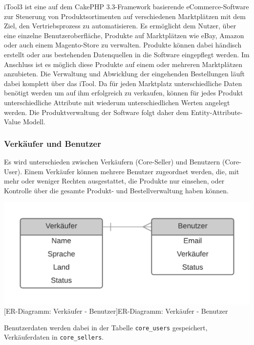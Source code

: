 	iTool3 ist eine auf dem CakePHP 3.3-Framework basierende eCommerce-Software  zur Steuerung von Produktsortimenten auf verschiedenen Marktplätzen mit dem Ziel, den
	Vertriebsprozess zu automatisieren. Es ermöglicht dem Nutzer, über eine einzelne Benutzeroberfläche, Produkte auf Marktplätzen wie eBay, Amazon oder auch einem Magento-Store
	zu verwalten. Produkte können dabei händisch erstellt oder aus bestehenden Datenquellen in die Software	eingepflegt werden. Im Anschluss ist es möglich diese Produkte auf einem oder mehreren Marktplätzen anzubieten. Die Verwaltung und Abwicklung der eingehenden Bestellungen läuft dabei komplett über das iTool.
	Da für jeden Marktplatz unterschiedliche Daten benötigt werden um auf ihm erfolgreich zu verkaufen, können für jedes Produkt unterschiedliche Attribute mit wiederum unterschiedlichen Werten angelegt werden. Die Produktverwaltung der Software folgt daher dem Entity-Attribute-Value Modell.
	
	
	\subsubsection{Verkäufer und Benutzer}
	
	Es wird unterschieden zwischen Verkäufern (Core-Seller) und Benutzern (Core-User). Einem Verkäufer können mehrere Benutzer zugeordnet werden, die, mit mehr oder weniger Rechten ausgestattet, die Produkte nur einsehen, oder Kontrolle über die gesamte Produkt- und Bestellverwaltung haben können.\\
	\begin{minipage}{\linewidth}
		\vspace{1em}
		\centering
		\includegraphics[width=0.6\linewidth]{img/ERD_Seller_User_complete}
		[ER-Diagramm: Verkäufer - Benutzer]{ER-Diagramm: Verkäufer - Benutzer}
		\label{fig:header}
		\vspace{1em}
	\end{minipage}
	
	Benutzerdaten werden dabei in der Tabelle \texttt{core\_users} gespeichert, Verkäuferdaten in \texttt{core\_sellers}.

	 
	
